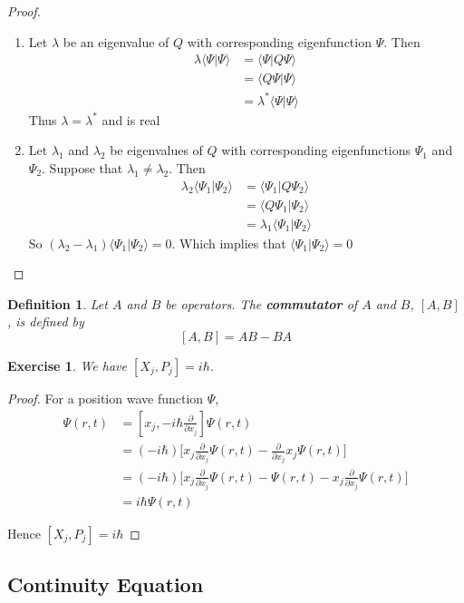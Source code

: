 \documentclass[12pt]{amsart}
\newtheorem{defn}[thm]{Definition}
\newtheorem{ex}[thm]{Exercise}
\renewcommand{\r}{\rangle}
\renewcommand{\l}{\langle}
\newcommand{\lam}{\lambda}
\newcommand{\p}[1]{\frac{\partial}{\partial{#1}}}
\begin{document}
\begin{proof}
\ \begin{enumerate}
\item Let $\lam$ be an eigenvalue of $Q$ with corresponding eigenfunction $\Psi$. Then 
\begin{align*}
 \lam \l \Psi \vert \Psi\r
&= \l \Psi \vert Q \Psi\r \\
&= \l Q \Psi \vert \Psi\r \\
&= \lam^* \l \Psi \vert \Psi\r
\end{align*}
Thus $\lam = \lam^*$ and is real

\item Let $\lam_1$ and $\lam_2$ be eigenvalues of $Q$ with corresponding eigenfunctions $\Psi_1$ and $\Psi_2$. Suppose that $\lam_1 \neq \lam_2$. Then 
\begin{align*}
\lam_2 \l \Psi_1 \vert  \Psi_2\r
&= \l \Psi_1 \vert Q \Psi_2\r\\
&= \l Q \Psi_1 \vert  \Psi_2\r\\
&= \lam_1 \l \Psi_1 \vert  \Psi_2\r
\end{align*}
So $(\lam_2 - \lam_1)\l \Psi_1 \vert  \Psi_2\r = 0$. Which implies that $\l \Psi_1 \vert  \Psi_2\r=0$
\end{enumerate}
\end{proof}

\begin{defn}
Let $A$ and $B$ be operators. The \textbf{commutator} of $A$ and $B$, $[A,B]$, is defined by $$[A,B] = AB - BA$$
\end{defn}

\begin{ex}
We have $[X_j, P_j] = i\hbar$.
\end{ex}

\begin{proof}
For a position wave function $\Psi$, 
\begin{align*}
[X_j, P_j]\Psi(r,t)
&= [x_j, -i\hbar \p{x_j}]\Psi(r,t)\\
&= (-i\hbar) \bigg[x_j \p{x_j}\Psi(r,t)- \p{x_j}x_j\Psi(r,t)\bigg]\\
&= (-i\hbar)\bigg[ x_j \p{x_j}\Psi(r,t)- \Psi(r,t) - x_j \p{x_j}\Psi(r,t)\bigg]\\
&=i\hbar \Psi(r,t)
\end{align*}

Hence $[X_j, P_j] = i\hbar$
\end{proof}

\subsection{Continuity Equation}
\end{document}
